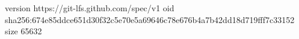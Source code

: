 version https://git-lfs.github.com/spec/v1
oid sha256:674e85ddce651d30f32c5e70e5a69646c78e676b4a7b42dd18d719fff7c33152
size 65632
